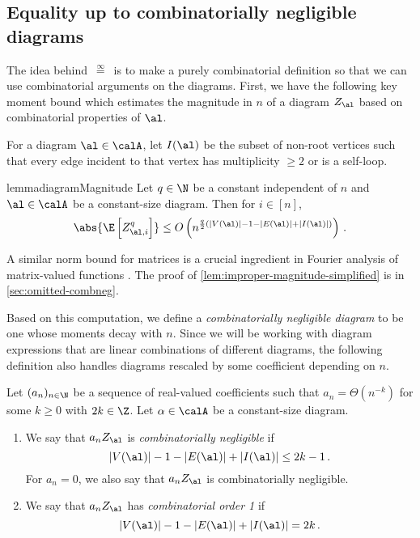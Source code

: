 \documentclass[12pt]{article}
\newcommand{\eqinf}{\,\overset{\infty}{=}\,}
\begin{document}
\subsection{Equality up to combinatorially negligible diagrams}
\label{sec:eqinf}

The idea behind $\eqinf$ is to make a purely combinatorial definition
so that we can use combinatorial arguments on the diagrams.
First, we have the following key moment bound which estimates the magnitude in $n$
of a diagram $Z_\al$ based on combinatorial properties of $\al$.

\begin{definition}[$I(\al)$]\label{def:isolated}
     For a diagram $\al \in \calA$, let $I(\al)$ be the subset
     of non-root vertices such that every edge incident to that vertex has multiplicity $\geq 2$ or is a self-loop.
\end{definition}

\begin{restatable}{lemma}{diagramMagnitude}
\label{lem:improper-magnitude-simplified}
Let $q\in\N$ be a constant independent of $n$ and $\al \in \calA$ be a constant-size diagram. Then for $i\in [n]$,
        \[
        \abs{\E\left[Z_{\al,i}^q\right]} \leq O\left( n^{\frac q 2\left(|V(\al)| - 1 - |E(\al)|+|I(\al)|\right)}\right)\,.
    \]
\end{restatable}


A similar norm bound for matrices is a crucial ingredient in Fourier analysis of matrix-valued functions \cite{AMP20}.
The proof of \cref{lem:improper-magnitude-simplified} is in \cref{sec:omitted-combneg}.

Based on this computation, we define a \emph{combinatorially negligible diagram} to be one whose moments decay with $n$. Since we will be working with diagram expressions that are linear combinations of different diagrams, the following definition also handles diagrams rescaled by some coefficient depending on $n$.

\begin{definition}
\label{def:combinatorially-negligible}
    Let $(a_n)_{n \in \N}$ be a sequence of real-valued coefficients such that $a_n=\Theta(n^{-k})$ for some $k\ge 0$ with $2k\in\Z$. Let $\alpha\in\calA$ be a constant-size diagram.

    \begin{enumerate}
        \item We say that $a_n Z_\al$ is \emph{combinatorially negligible}
        if
    \[|V(\al)| - 1 - |E(\al)| + |I(\al)| \le 2k-1\,.\]
        For $a_n=0$, we also say that $a_n Z_\al$ is combinatorially negligible.
        \item We say that $a_n Z_\al$ has \emph{combinatorial order 1} if
    \[|V(\al)| - 1 - |E(\al)| + |I(\al)| = 2k\,.\]
    \end{enumerate}
\end{definition}
\end{document}
